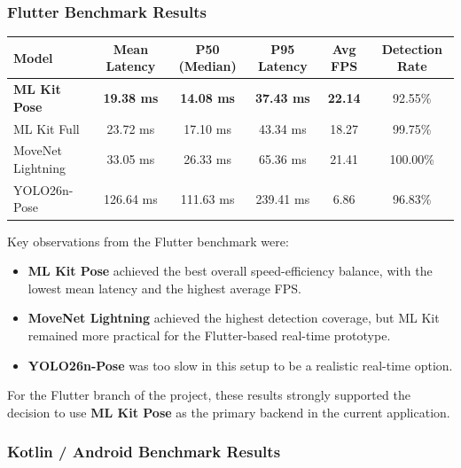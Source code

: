 \documentclass[12pt,a4paper]{article}
\begin{document}
\subsubsection{Flutter Benchmark Results}

\begin{table}[H]
\centering
\small
\begin{tabularx}{\textwidth}{>{\raggedright\arraybackslash}X c c c c c}
\toprule
\textbf{Model} & \textbf{Mean Latency} & \textbf{P50 (Median)} & \textbf{P95 Latency} & \textbf{Avg FPS} & \textbf{Detection Rate} \\
\midrule
\textbf{ML Kit Pose} & \textbf{19.38 ms} & \textbf{14.08 ms} & \textbf{37.43 ms} & \textbf{22.14} & 92.55\% \\
ML Kit Full & 23.72 ms & 17.10 ms & 43.34 ms & 18.27 & 99.75\% \\
MoveNet Lightning & 33.05 ms & 26.33 ms & 65.36 ms & 21.41 & 100.00\% \\
YOLO26n-Pose & 126.64 ms & 111.63 ms & 239.41 ms & 6.86 & 96.83\% \\
\bottomrule
\end{tabularx}
\end{table}

Key observations from the Flutter benchmark were:

\begin{itemize}
    \item \textbf{ML Kit Pose} achieved the best overall speed-efficiency balance, with the lowest mean latency and the highest average FPS.
    \item \textbf{MoveNet Lightning} achieved the highest detection coverage, but ML Kit remained more practical for the Flutter-based real-time prototype.
    \item \textbf{YOLO26n-Pose} was too slow in this setup to be a realistic real-time option.
\end{itemize}

For the Flutter branch of the project, these results strongly supported the decision to use \textbf{ML Kit Pose} as the primary backend in the current application.

\subsubsection{Kotlin / Android Benchmark Results}
\end{document}

